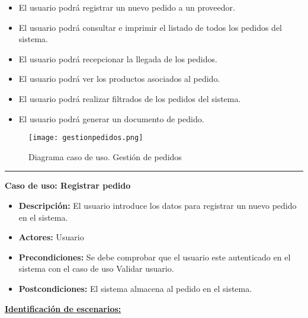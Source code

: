 \begin{itemize}
 \item El usuario podrá registrar un nuevo pedido a un proveedor.
 \item El usuario podrá consultar e imprimir el listado de todos los pedidos del sistema.
 \item El usuario podrá recepcionar la llegada de los pedidos.
 \item El usuario podrá ver los productos asociados al pedido.
 \item El usuario podrá realizar filtrados de los pedidos del sistema.
 \item El usuario podrá generar un documento de pedido.
\end{itemize}
\begin{figure}[H]
  \centering
    \texttt{[image: gestionpedidos.png]}
  \caption{Diagrama caso de uso. Gestión de pedidos}
  \label{cu1}
\end{figure}
\smallskip
\hrule height 1pt
\smallskip
\textbf{Caso de uso: Registrar pedido}
\begin{itemize}\renewcommand{\labelitemi}{$\cdot$}
 \item \textbf{Descripción:} El usuario introduce los datos para registrar un nuevo pedido en el sistema.
  \item \textbf{Actores:} Usuario
  \item \textbf{Precondiciones:} Se debe comprobar que el usuario este autenticado en el sistema con el caso de uso Validar usuario.
  \item \textbf{Postcondiciones:} El sistema almacena al pedido en el sistema.
\end{itemize}
\underline{\textbf{Identificación de escenarios:}}
